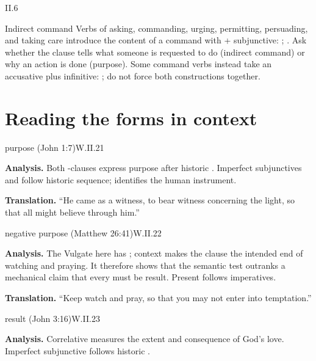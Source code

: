 \begin{courseunit}{II.6}
\begin{grammarbox}{Indirect command}
Verbs of asking, commanding, urging, permitting, persuading, and taking care introduce the
content of a command with  + subjunctive: ;
.  Ask whether the clause tells what someone is requested to do
(indirect command) or why an action is done (purpose).  Some command verbs instead take an
accusative plus infinitive: ; do not force both constructions together.
\end{grammarbox}

\section{Reading the forms in context}

\begin{workedexample}{purpose (John 1:7)}{W.II.21}

\textbf{Analysis.}  Both -clauses express purpose after historic .
Imperfect subjunctives  and  follow historic sequence;
 identifies the human instrument.

\textbf{Translation.}  ``He came as a witness, to bear witness concerning the light, so that
all might believe through him.''
\end{workedexample}

\begin{workedexample}{negative purpose (Matthew 26:41)}{W.II.22}

\textbf{Analysis.}  The Vulgate here has ; context makes the clause the intended
end of watching and praying.  It therefore shows that the semantic test outranks a mechanical
claim that every  must be result.  Present  follows imperatives.

\textbf{Translation.}  ``Keep watch and pray, so that you may not enter into temptation.''
\end{workedexample}

\begin{workedexample}{result (John 3:16)}{W.II.23}

\textbf{Analysis.}  Correlative  measures the extent and consequence of
God's love.  Imperfect subjunctive  follows historic .


\end{workedexample}
\end{courseunit}
